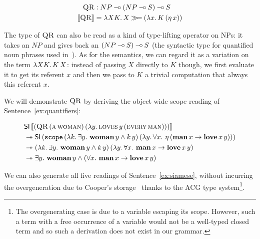 \begin{align*}
  \textsc{QR} &: NP \mathbin{{-}\mkern-3.5mu{\circ}} (NP \mathbin{{-}\mkern-3.5mu{\circ}} S) \mathbin{{-}\mkern-3.5mu{\circ}} S \\
  \llbracket \textsc{QR} \rrbracket &= \lambda X K.\, X \mathbin{\gg\!=} (\lambda x.\, K\,(\eta\,x))
\end{align*}

The type of $\textsc{QR}$ can also be read as a kind of type-lifting operator
on NPs: it takes an $NP$ and gives back an $(NP \mathbin{{-}\mkern-3.5mu{\circ}} S) \mathbin{{-}\mkern-3.5mu{\circ}} S$ (the
syntactic type for quantified noun phrases used
in~\cite{pogodalla2007generalizing}). As for the semantics, we can regard
it as a variation on the term $\lambda X K.\, K\,X$: instead of passing
$X$ directly to $K$ though, we first evaluate it to get its referent $x$
and then we pass to $K$ a trivial computation that always this referent
$x$.

We will demonstrate $\textsc{QR}$ by deriving the object wide scope reading of
Sentence~\ref{ex:quantifiers}:

\addtocounter{equation}{-2}
\NoChapterPrefix
\begin{align}
& \ap{\SI}{\sem{(\app{\abs{QR}}{(\ap{\abs{a}}{\abs{woman}})}{(\lam{y}{\app{\abs{loves}}{y}{(\ap{\abs{every}}{\abs{man}})}})})}} \nonumber \\
&\tto \ap{\SI}{(\app{\op{scope}}
  {(\lam{k}{\exists y.\ \ap{\obj{woman}}{y} \land \ap{k}{y}})}
  {(\lam{y}{\forall x.\ \etaE{(\ap{\obj{man}}{x} \rightarrow \app{\obj{love}}{x}{y})}})})} \nonumber \\
&\tto \ap{(\lam{k}{\exists y.\ \ap{\obj{woman}}{y} \land \ap{k}{y}})}
         {(\lam{y}{\forall x.\ \ap{\obj{man}}{x} \rightarrow \app{\obj{love}}{x}{y}})} \nonumber \\
&\tto \exists y.\ \ap{\obj{woman}}{y} \land (\forall x.\ \ap{\obj{man}}{x} \rightarrow \app{\obj{love}}{x}{y})
\end{align}
\ChapterPrefix
\addtocounter{equation}{1}

We can also generate all five readings of Sentence~\ref{ex:siamese},
without incurring the overgeneration due to Cooper's
storage~\cite{burchardt2004computational} thanks to the ACG type
system\footnote{The overgenerating case is due to a variable escaping its
  scope. However, such a term with a free occurrence of a variable would
  not be a well-typed closed term and so such a derivation does not
  exist in our grammar.}.

